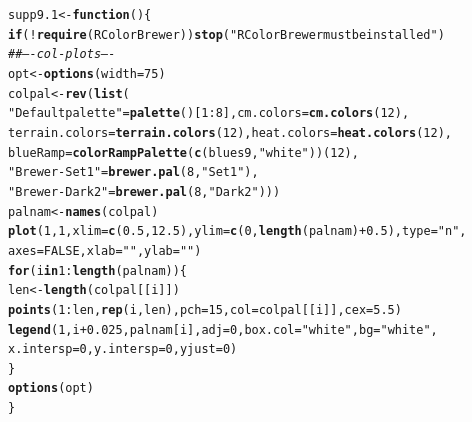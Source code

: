 \documentclass[12pt, a4paper,  BCOR=8.25mm, DIV=15]{scrartcl}\usepackage[]{graphicx}\usepackage[]{color}
\makeatletter
\newcommand{\hlnum}[1]{\textcolor[rgb]{0.686,0.059,0.569}{#1}}%
\newcommand{\hlstr}[1]{\textcolor[rgb]{0.192,0.494,0.8}{#1}}%
\newcommand{\hlcom}[1]{\textcolor[rgb]{0.678,0.584,0.686}{\textit{#1}}}%
\newcommand{\hlopt}[1]{\textcolor[rgb]{0,0,0}{#1}}%
\newcommand{\hlstd}[1]{\textcolor[rgb]{0.345,0.345,0.345}{#1}}%
\newcommand{\hlkwa}[1]{\textcolor[rgb]{0.161,0.373,0.58}{\textbf{#1}}}%
\newcommand{\hlkwb}[1]{\textcolor[rgb]{0.69,0.353,0.396}{#1}}%
\newcommand{\hlkwc}[1]{\textcolor[rgb]{0.333,0.667,0.333}{#1}}%
\newcommand{\hlkwd}[1]{\textcolor[rgb]{0.737,0.353,0.396}{\textbf{#1}}}%
\newenvironment{kframe}{%
 \def\at@end@of@kframe{}%
 \ifinner\ifhmode%
  \def\at@end@of@kframe{\end{minipage}}%
  \begin{minipage}{\columnwidth}%
 \fi\fi%
 \def\FrameCommand##1{\hskip\@totalleftmargin \hskip-\fboxsep
 \colorbox{shadecolor}{##1}\hskip-\fboxsep
     \hskip-\linewidth \hskip-\@totalleftmargin \hskip\columnwidth}%
 \MakeFramed {\advance\hsize-\width
   \@totalleftmargin\z@ \linewidth\hsize
   \@setminipage}}%
 {\par\unskip\endMakeFramed%
 \at@end@of@kframe}
\newenvironment{knitrout}{}{} %
\makeatother
\begin{document}
\begin{knitrout}
\color{fgcolor}\begin{kframe}
\begin{alltt}
\hlstd{supp9.1} \hlkwb{<-} \hlkwa{function}\hlstd{()\{}
\hlkwa{if}\hlstd{(}\hlopt{!}\hlkwd{require}\hlstd{(RColorBrewer))}\hlkwd{stop}\hlstd{(}\hlstr{"RColorBrewer must be installed"}\hlstd{)}
\hlcom{## ---- col-plots ----}
\hlstd{opt} \hlkwb{<-} \hlkwd{options}\hlstd{(}\hlkwc{width}\hlstd{=}\hlnum{75}\hlstd{)}
\hlstd{colpal} \hlkwb{<-} \hlkwd{rev}\hlstd{(}\hlkwd{list}\hlstd{(}
    \hlstr{"Default palette"} \hlstd{=} \hlkwd{palette}\hlstd{()[}\hlnum{1}\hlopt{:}\hlnum{8}\hlstd{],}  \hlkwc{cm.colors} \hlstd{=} \hlkwd{cm.colors}\hlstd{(}\hlnum{12}\hlstd{),}
    \hlkwc{terrain.colors} \hlstd{=} \hlkwd{terrain.colors}\hlstd{(}\hlnum{12}\hlstd{),} \hlkwc{heat.colors} \hlstd{=} \hlkwd{heat.colors}\hlstd{(}\hlnum{12}\hlstd{),}
    \hlkwc{blueRamp} \hlstd{=} \hlkwd{colorRampPalette}\hlstd{(}\hlkwd{c}\hlstd{(blues9,} \hlstr{"white"}\hlstd{))(}\hlnum{12}\hlstd{),}
    \hlstr{"Brewer-Set1"} \hlstd{=} \hlkwd{brewer.pal}\hlstd{(}\hlnum{8}\hlstd{,} \hlstr{"Set1"}\hlstd{),}
    \hlstr{"Brewer-Dark2"} \hlstd{=} \hlkwd{brewer.pal}\hlstd{(}\hlnum{8}\hlstd{,} \hlstr{"Dark2"}\hlstd{)))}
\hlstd{palnam} \hlkwb{<-} \hlkwd{names}\hlstd{(colpal)}
\hlkwd{plot}\hlstd{(}\hlnum{1}\hlstd{,} \hlnum{1}\hlstd{,} \hlkwc{xlim}\hlstd{=}\hlkwd{c}\hlstd{(}\hlnum{0.5}\hlstd{,}\hlnum{12.5}\hlstd{),} \hlkwc{ylim}\hlstd{=}\hlkwd{c}\hlstd{(}\hlnum{0}\hlstd{,}\hlkwd{length}\hlstd{(palnam)}\hlopt{+}\hlnum{0.5}\hlstd{),} \hlkwc{type}\hlstd{=}\hlstr{"n"}\hlstd{,}
     \hlkwc{axes}\hlstd{=}\hlnum{FALSE}\hlstd{,} \hlkwc{xlab}\hlstd{=}\hlstr{""}\hlstd{,} \hlkwc{ylab}\hlstd{=}\hlstr{""}\hlstd{)}
\hlkwa{for}\hlstd{(i} \hlkwa{in} \hlnum{1}\hlopt{:}\hlkwd{length}\hlstd{(palnam))\{}
    \hlstd{len} \hlkwb{<-} \hlkwd{length}\hlstd{(colpal[[i]])}
    \hlkwd{points}\hlstd{(}\hlnum{1}\hlopt{:}\hlstd{len,} \hlkwd{rep}\hlstd{(i,len),} \hlkwc{pch}\hlstd{=}\hlnum{15}\hlstd{,} \hlkwc{col}\hlstd{=colpal[[i]],} \hlkwc{cex}\hlstd{=}\hlnum{5.5}\hlstd{)}
    \hlkwd{legend}\hlstd{(}\hlnum{1}\hlstd{, i}\hlopt{+}\hlnum{0.025}\hlstd{, palnam[i],} \hlkwc{adj}\hlstd{=}\hlnum{0}\hlstd{,} \hlkwc{box.col}\hlstd{=}\hlstr{"white"}\hlstd{,} \hlkwc{bg}\hlstd{=}\hlstr{"white"}\hlstd{,}
           \hlkwc{x.intersp}\hlstd{=}\hlnum{0}\hlstd{,} \hlkwc{y.intersp}\hlstd{=}\hlnum{0}\hlstd{,} \hlkwc{yjust}\hlstd{=}\hlnum{0}\hlstd{)}
\hlstd{\}}
\hlkwd{options}\hlstd{(opt)}
\hlstd{\}}
\end{alltt}
\end{kframe}
\end{knitrout}
\end{document}
